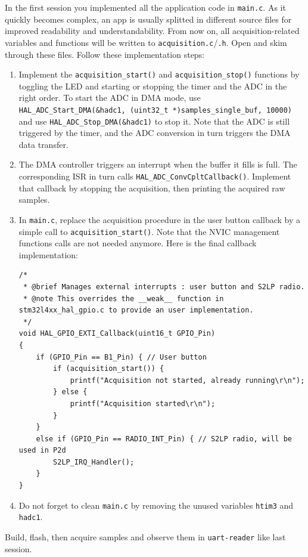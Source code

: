 In the first session you implemented all the application code in \texttt{main.c}. As it quickly becomes complex, an app is usually splitted in different source files for improved readability and understandability. From now on, all acquisition-related variables and functions will be written to \texttt{acquisition.c}/\texttt{.h}. Open and skim through these files. Follow these implementation steps:
\begin{enumerate}
    \item Implement the \texttt{acquisition\_start()} and \texttt{acquisition\_stop()} functions by toggling the LED and starting or stopping the timer and the ADC in the right order. To start the ADC in DMA mode, use \texttt{HAL\_ADC\_Start\_DMA(\&hadc1, (uint32\_t *)samples\_single\_buf, 10000)} and use \texttt{HAL\_ADC\_Stop\_DMA(\&hadc1)} to stop it. Note that the ADC is still triggered by the timer, and the ADC conversion in turn triggers the DMA data transfer.
    \item The DMA controller triggers an interrupt when the buffer it fills is full. The corresponding ISR in turn calls \texttt{HAL\_ADC\_ConvCpltCallback()}. Implement that callback by stopping the acquisition, then printing the acquired raw samples.
    \item In \texttt{main.c}, replace the acquisition procedure in the user button callback by a simple call to \texttt{acquisition\_start()}. Note that the NVIC management functions calls are not needed anymore. Here is the final callback implementation:
    \begin{lstlisting}[columns=fullflexible]
/*
 * @brief Manages external interrupts : user button and S2LP radio.
 * @note This overrides the __weak__ function in stm32l4xx_hal_gpio.c to provide an user implementation.
 */
void HAL_GPIO_EXTI_Callback(uint16_t GPIO_Pin)
{
    if (GPIO_Pin == B1_Pin) { // User button
        if (acquisition_start()) {
            printf("Acquisition not started, already running\r\n");
        } else {
            printf("Acquisition started\r\n");
        }
    }
    else if (GPIO_Pin == RADIO_INT_Pin) { // S2LP radio, will be used in P2d
        S2LP_IRQ_Handler();
    }
}
    \end{lstlisting}
    \item Do not forget to clean \texttt{main.c} by removing the unused variables \texttt{htim3} and \texttt{hadc1}.
\end{enumerate}

Build, flash, then acquire samples and observe them in \texttt{uart-reader} like last session.

